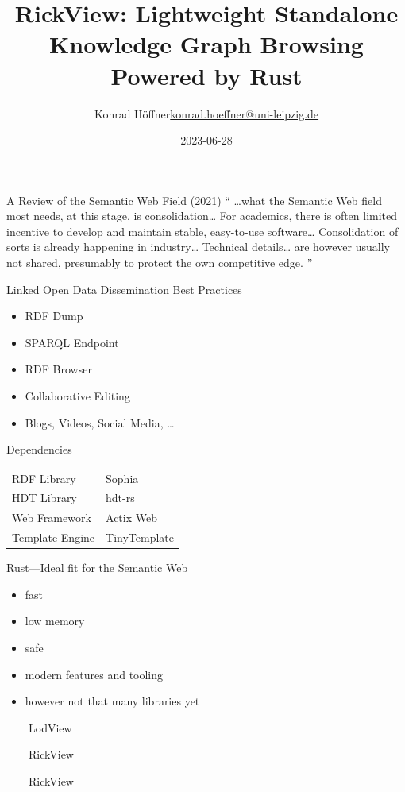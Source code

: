 \documentclass[14pt,aspectratio=169]{beamer}
\date{2023-06-28}
\author{\texorpdfstring{Konrad Höffner\newline\url{konrad.hoeffner@uni-leipzig.de}}{Konrad Höffner}}
\title{RickView: Lightweight Standalone Knowledge Graph Browsing Powered by Rust}
\subtitle{}
\newcommand{\imageslide}[4][]
{
\begin{frame}[plain]{~~~~#2}
\vspace{0.2em}
\centering\makebox[\linewidth]{\texttt{[image: \#3]}}
\\#1
\note{#4}
\end{frame}
}
\begin{document}
\begin{frame}
\titlepage
\end{frame}

\begin{frame}{A Review of the Semantic Web Field (2021)}
\enquote{
\ldots{}what the Semantic Web field most needs, at this stage, is consolidation\ldots
For academics, there is often limited incentive to develop and maintain stable, easy-to-use software\ldots
Consolidation of sorts is already happening in industry\ldots
Technical details\ldots{} are however usually not shared, presumably to protect the own competitive edge.
}
\end{frame}

\begin{frame}{Linked Open Data Dissemination Best Practices}
\begin{itemize}
\item RDF Dump
\item SPARQL Endpoint
\item RDF Browser
\pause
\item Collaborative Editing
\item Blogs, Videos, Social Media, \ldots
\end{itemize}
\end{frame}

\begin{frame}{Dependencies}
\begin{tabular}{ll}
RDF Library		&Sophia\\%
HDT Library		&hdt-rs\\
Web Framework	&Actix Web\\
Template Engine	&TinyTemplate\\
\end{tabular}
\end{frame}

\begin{frame}{Rust---Ideal fit for the Semantic Web}
\begin{itemize}
\item fast
\item low memory
\item safe
\item modern features and tooling
\pause
\item however not that many libraries yet
\end{itemize}
\end{frame}

\imageslide{LodView}{img/lodview-screenshot.png}{}
\imageslide{RickView}{img/rickview-screenshot1.png}{}
\imageslide{RickView}{img/rickview-screenshot2.png}{}
\end{document}
